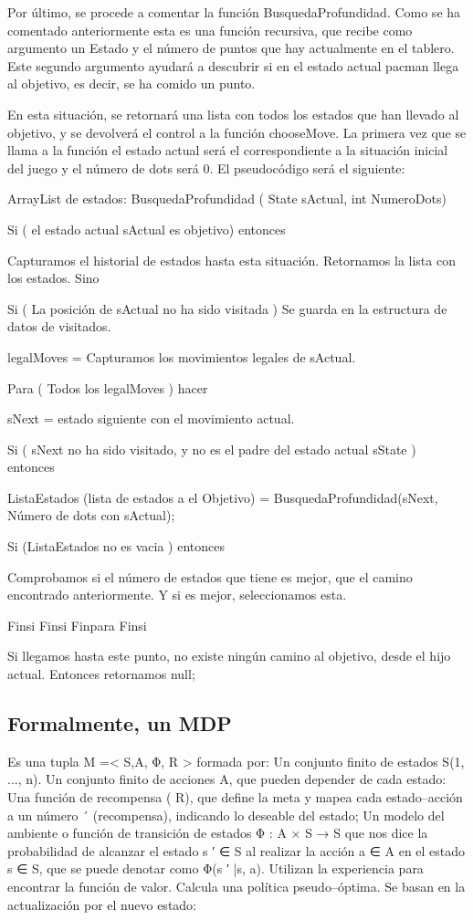 \documentclass[letterpaper, 10 pt, conference]{ieeeconf}  %
\begin{document}
Por último, se procede a comentar la función BusquedaProfundidad. Como se ha comentado anteriormente esta es una función recursiva, que recibe como argumento un Estado y el número de puntos que hay actualmente en el tablero. Este segundo argumento ayudará a descubrir si en el estado actual pacman llega al objetivo, es decir, se ha comido un punto.

En esta situación, se retornará una lista con todos los estados que han llevado al objetivo, y se devolverá el control a la función chooseMove.
La primera vez que se llama a la función el estado actual será el correspondiente a la situación inicial del juego y el número de dots será 0. El pseudocódigo será el siguiente:

ArrayList de estados: BusquedaProfundidad ( State sActual, int NumeroDots){

      Si ( el estado actual sActual es objetivo) entonces
           
            Capturamos el historial de estados hasta esta situación.
            Retornamos la lista con los estados.          
      Sino

            Si ( La posición de sActual no ha sido visitada )
                  Se guarda en la estructura de datos de visitados.

            legalMoves = Capturamos los movimientos legales de sActual.

            Para ( Todos los legalMoves ) hacer

                  sNext = estado siguiente con el movimiento actual.

Si ( sNext no ha sido visitado, y no es el padre del estado actual sState ) entonces

ListaEstados (lista de estados a el Objetivo) = BusquedaProfundidad(sNext, Número de dots con sActual);
     
Si (ListaEstados no es vacia ) entonces

Comprobamos si el número de estados que tiene es mejor, que el camino encontrado anteriormente. Y si es mejor, seleccionamos esta.

                        Finsi
                  Finsi
Finpara
Finsi

Si llegamos hasta este punto, no existe ningún camino al objetivo, desde el hijo actual.
Entonces retornamos null;
}

\subsection{Formalmente, un MDP}
Es una tupla M =< S,A, Φ, R > formada por: Un conjunto finito de estados S({1, ..., n}).  Un conjunto finito de acciones A, que pueden depender de cada estado: Una función de recompensa ( R), que define la meta y mapea cada estado–acción a un número ´ (recompensa), indicando lo deseable del estado; Un modelo del ambiente o función de transición de estados Φ : A × S → S que nos dice la probabilidad de alcanzar el estado s ′ ∈ S al realizar la acción a ∈ A en el estado s ∈ S, que se puede denotar como Φ(s ′ |s, a).
Utilizan la experiencia para encontrar la función de valor. 
Calcula una política pseudo–óptima.
Se basan en la actualización por el nuevo estado:
\end{document}
